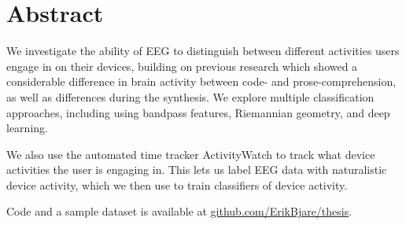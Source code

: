 \section{Abstract}

We investigate the ability of EEG to distinguish between different activities users engage in on their devices, building on previous research which showed a considerable difference in brain activity between code- and prose-comprehension, as well as differences during the synthesis. We explore multiple classification approaches, including using bandpass features, Riemannian geometry, and deep learning.

We also use the automated time tracker ActivityWatch to track what device activities the user is engaging in. This lets us label EEG data with naturalistic device activity, which we then use to train classifiers of device activity.

Code and a sample dataset is available at \href{https://github.com/ErikBjare/thesis}{github.com/ErikBjare/thesis}.
